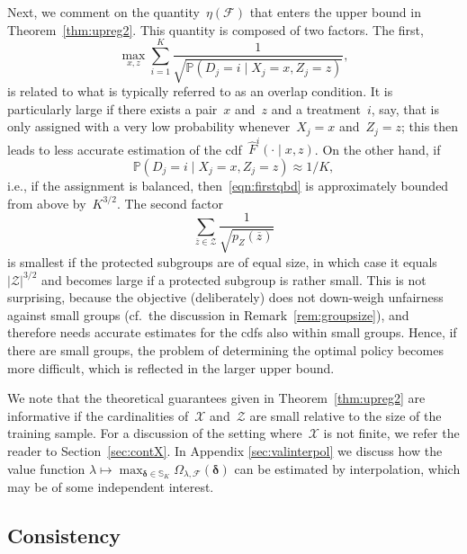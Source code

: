 \documentclass[11pt, a4paper]{article}
\theoremstyle{definition}
\begin{document}
Next, we comment on the quantity~$\eta(\mathcal{F})$ that enters the upper bound in Theorem~\ref{thm:upreg2}. This quantity is composed of two factors. The first, \begin{equation}\label{eqn:firstqbd}
\max_{x, z} \sum_{i = 1}^K\frac{1}{ \sqrt{\mathbb{P}\left(D_j = i \mid X_j = x, Z_j = z\right)}},
\end{equation}
is related to what is typically referred to as an overlap condition. It is particularly large if there exists a pair~$x$ and~$z$ and a treatment~$i$, say, that is only assigned with a very low probability whenever~$X_j = x$ and~$Z_j = z$; this then leads to less accurate estimation of the cdf~$\hat{F}^i(\cdot \mid x, z)$. On the other hand, if $$ \mathbb{P}\left(D_j = i \mid X_j = x, Z_j = z\right) \approx  1/K,$$ i.e., if the assignment is balanced, then~\eqref{eqn:firstqbd} is approximately bounded from above by~$K^{3/2}.$ The second factor~$$\sum_{\overline{z} \in \mathcal{Z}} \frac{1}{\sqrt{p_Z(\overline{z})}}$$ is smallest if the protected subgroups are of equal size, in which case it equals~$|\mathcal{Z}|^{3/2}$ and becomes large if a protected subgroup is rather small. This is not surprising, because the objective (deliberately) does not down-weigh unfairness against small groups (cf.~the discussion in Remark~\ref{rem:groupsize}), and therefore needs accurate estimates for the cdfs also within small groups. Hence, if there are small groups, the problem of determining the optimal policy becomes more difficult, which is reflected in the larger upper bound. 

We note that the theoretical guarantees given in Theorem~\ref{thm:upreg2} are informative if the cardinalities of~$\mathcal{X}$ and~$\mathcal{Z}$ are small relative to the size of the training sample. For a discussion of the setting where~$\mathcal{X}$ is not finite, we refer the reader to Section~\ref{sec:contX}. In Appendix \ref{sec:valinterpol} we discuss how the value function $\lambda \mapsto \max_{\bm{\delta} \in \mathbb{S}_K} \Omega_{\lambda, \mathcal{F}}(\bm{\delta})$ can be estimated by interpolation, which may be of some independent interest.


\subsection{Consistency}\label{ssec:consi}
\end{document}
